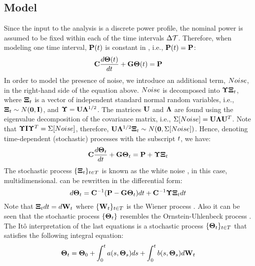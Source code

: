 \subsection{Model}
Since the input to the analysis is a discrete power profile, the nominal power is assumed to be fixed within each of the time intervals $\Delta \mathcal{T}$. Therefore, when modeling one time interval, $\mathbf{P}(t)$ is constant in , i.e., $\mathbf{P}(t) = \mathbf{P}$:
\[
  \mathbf{C} \frac{d\mathbf{\Theta}(t)}{dt} + \mathbf{G} \mathbf{\Theta}(t) = \mathbf{P}
\]
In order to model the presence of noise, we introduce an additional term, $Noise$, in the right-hand side of the equation above. $Noise$ is decomposed into $\mathbf{\Upsilon} \mathbf{\Xi}_t$, where $\mathbf{\Xi}_t$ is a vector of independent standard normal random variables, i.e., $\mathbf{\Xi}_t \sim N(\mathbf{0}, \mathbf{I})$, and  $\mathbf{\Upsilon} = \mathbf{U} \mathbf{\Lambda}^{1/2}$. The matrices $\mathbf{U}$ and $\mathbf{\Lambda}$ are found using the eigenvalue decomposition of the covariance matrix, i.e., $\Sigma[Noise] = \mathbf{U} \mathbf{\Lambda} \mathbf{U}^T$. Note that $\mathbf{\Upsilon} \mathbf{I} \mathbf{\Upsilon}^T = \Sigma[Noise]$, therefore, $\mathbf{U} \mathbf{\Lambda}^{1/2} \mathbf{\Xi}_t \sim N(\mathbf{0}, \Sigma[Noise])$. Hence, denoting time-dependent (stochastic) processes with the subscript $t$, we have:
\begin{equation} \equlabel{fourier-noise}
  \mcapacitance \frac{d\vtemperature_\time}{d\time} + \mconductance \vtemperature_\time = \vpower + \mnoisedeviation \vnoise_t
\end{equation}
The stochastic process $\{ \mathbf{\Xi}_t \}_{t \in T}$ is known as the white noise \cite{oksendal2003}, in this case, multidimensional.  can be rewritten in the differential form:
\begin{equation} \equlabel{fourier-wiener}
  d\vtemperature_\time = \mcapacitance^{-1}(\vpower - \mconductance \vtemperature_\time)d\time + \mcapacitance^{-1} \mnoisedeviation \vnoise_t d\time
\end{equation}
Note that $\mathbf{\Xi}_t dt = d\mathbf{W}_t$ where $\{ \mathbf{W}_t \}_{t \in T}$ is the Wiener process \cite{oksendal2003}. Also it can be seen that the stochastic process $\{ \mathbf{\Theta}_t \}$ resembles the Ornstein-Uhlenbeck process \cite{kloeden1992}. The It\^{o} interpretation \cite{oksendal2003} of the last equations is a stochastic process $\{ \mathbf{\Theta}_t \}_{t \in T}$ that satisfies the following integral equation:
\[
  \mathbf{\Theta}_t = \mathbf{\Theta}_0 + \int_0^t a(s, \mathbf{\Theta}_s)ds + \int_0^t b(s, \mathbf{\Theta}_s) d\mathbf{W}_t
\]
